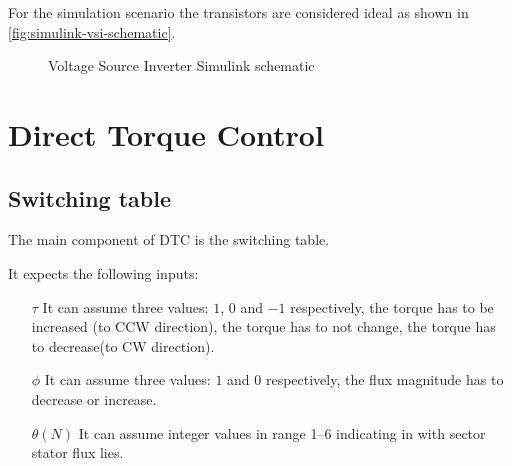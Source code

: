 For the simulation scenario the transistors are considered ideal as shown in \autoref{fig:simulink-vsi-schematic}.

\begin{figure}[h!]
	\centering
	\qquad
	\caption{Voltage Source Inverter Simulink schematic}
	\label{fig:simulink-vsi-schematic}
\end{figure}

\section{Direct Torque Control}

\subsection{Switching table}

The main component of DTC is the switching table.

It expects the following inputs:
\begin{itemize}
	\item[$\tau$] It can assume three values: $1$, $0$ and $-1$ respectively, the torque has to be increased (to CCW direction), the torque has to not change, the torque has to decrease(to CW direction).
	\item[$\phi$] It can assume three values: $1$ and $0$ respectively, the flux magnitude has to decrease or increase.
	\item[$\theta(N)$] It can assume integer values in range \numrange{1}{6} indicating in with sector stator flux lies.
\end{itemize}

